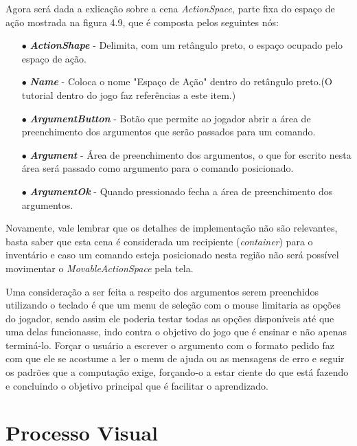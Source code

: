 Agora será dada a exlicação sobre a cena \textit{ActionSpace}, parte fixa do 
espaço de ação mostrada na figura 4.9, que é composta pelos seguintes nós:

\begin{itemize}
    \item[$\bullet$]
        \textbf{\textit{ActionShape}} - Delimita, com um retângulo preto, o
        espaço ocupado pelo espaço de ação.  
    \item[$\bullet$]
        \textbf{\textit{Name}} - Coloca o nome "Espaço de Ação" dentro do 
        retângulo preto.(O tutorial dentro do jogo faz referências a este item.) 
    \item[$\bullet$]
        \textbf{\textit{ArgumentButton}} - Botão que permite ao jogador 
        abrir a área de preenchimento dos argumentos que serão passados para um 
        comando.
    \item[$\bullet$]
        \textbf{\textit{Argument}} - Área de preenchimento dos argumentos, 
        o que for escrito nesta área será passado como argumento para o comando
        posicionado.  
    \item[$\bullet$]
        \textbf{\textit{ArgumentOk}} - Quando pressionado fecha a área de 
        preenchimento dos argumentos.
\end{itemize}

Novamente, vale lembrar que os detalhes de implementação não são relevantes, 
basta saber que esta cena é considerada um recipiente (\textit{container}) para 
o inventário e caso um comando esteja posicionado nesta região não será possível
movimentar o \textit{MovableActionSpace} pela tela.

Uma consideração a ser feita a respeito dos argumentos serem preenchidos 
utilizando o teclado é que um menu de seleção com o mouse limitaria as opções
do jogador, sendo assim ele poderia testar todas as opções disponíveis até que 
uma delas funcionasse, indo contra o objetivo do jogo que é ensinar e não apenas 
terminá-lo. Forçar o usuário a escrever o argumento com o formato pedido faz com
que ele se acostume a ler o menu de ajuda ou as mensagens de erro e seguir os 
padrões que a computação exige, forçando-o a estar ciente do que está fazendo e
concluindo o objetivo principal que é facilitar o aprendizado.

\section{Processo Visual}

